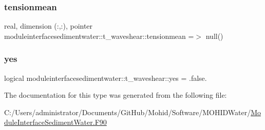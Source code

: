 \subsubsection{\texorpdfstring{tensionmean}{tensionmean}}
{\footnotesize\ttfamily real, dimension (\+:,\+:), pointer moduleinterfacesedimentwater\+::t\+\_\+waveshear\+::tensionmean =$>$ null()\hspace{0.3cm}{\ttfamily [private]}}

\mbox{\label{structmoduleinterfacesedimentwater_1_1t__waveshear_a34200c104d86de4de8e12e5f7baae52a}} 
\subsubsection{\texorpdfstring{yes}{yes}}
{\footnotesize\ttfamily logical moduleinterfacesedimentwater\+::t\+\_\+waveshear\+::yes = .false.\hspace{0.3cm}{\ttfamily [private]}}



The documentation for this type was generated from the following file\+:\begin{DoxyCompactItemize}
\item 
C\+:/\+Users/administrator/\+Documents/\+Git\+Hub/\+Mohid/\+Software/\+M\+O\+H\+I\+D\+Water/\mbox{\hyperlink{_module_interface_sediment_water_8_f90}{Module\+Interface\+Sediment\+Water.\+F90}}\end{DoxyCompactItemize}
